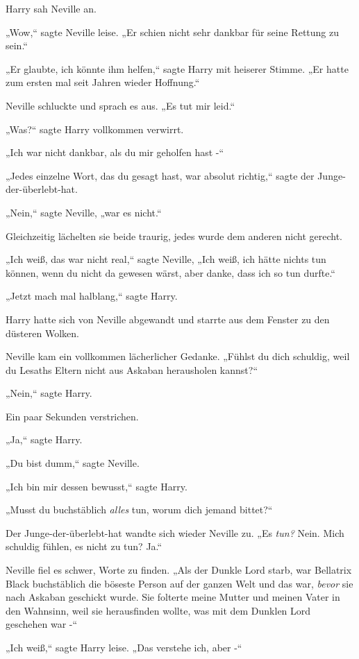 {Harry sah Neville an.

„Wow,“ sagte Neville leise. „Er schien nicht sehr dankbar für seine Rettung zu sein.“

„Er glaubte, ich könnte ihm helfen,“ sagte Harry mit heiserer Stimme. „Er hatte zum ersten mal seit Jahren wieder Hoffnung.“

Neville schluckte und sprach es aus. „Es tut mir leid.“

„Was?“ sagte Harry vollkommen verwirrt.

„Ich war nicht dankbar, als du mir geholfen hast -“

„Jedes einzelne Wort, das du gesagt hast, war absolut richtig,“ sagte der Junge-der-überlebt-hat.

„Nein,“ sagte Neville, „war es nicht.“

Gleichzeitig lächelten sie beide traurig, jedes wurde dem anderen nicht gerecht.

„Ich weiß, das war nicht real,“ sagte Neville, „Ich weiß, ich hätte nichts tun können, wenn du nicht da gewesen wärst, aber danke, dass ich so tun durfte.“

„Jetzt mach mal halblang,“ sagte Harry.

Harry hatte sich von Neville abgewandt und starrte aus dem Fenster zu den düsteren Wolken.

Neville kam ein vollkommen lächerlicher Gedanke. „Fühlst du dich schuldig, weil du Lesaths Eltern nicht aus Askaban herausholen kannst?“

„Nein,“ sagte Harry.

Ein paar Sekunden verstrichen.

„Ja,“ sagte Harry.

„Du bist dumm,“ sagte Neville.

„Ich bin mir dessen bewusst,“ sagte Harry.

„Musst du buchstäblich \emph{alles} tun, worum dich jemand bittet?“

Der Junge-der-überlebt-hat wandte sich wieder Neville zu. „Es \emph{tun?} Nein. Mich schuldig fühlen, es nicht zu tun? Ja.“

Neville fiel es schwer, Worte zu finden. „Als der Dunkle Lord starb, war Bellatrix Black buchstäblich die böseste Person auf der ganzen Welt und das war, \emph{bevor} sie nach Askaban geschickt wurde. Sie folterte meine Mutter und meinen Vater in den Wahnsinn, weil sie herausfinden wollte, was mit dem Dunklen Lord geschehen war -“

„Ich weiß,“ sagte Harry leise. „Das verstehe ich, aber -“

}
